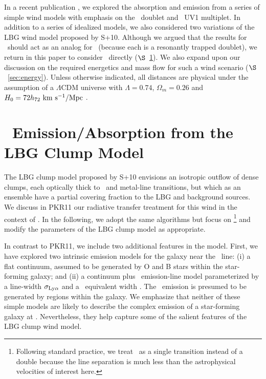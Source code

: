 \documentclass[12pt,preprint]{aastex}
\begin{document}
In a recent publication \citep[][hereafter PKR11]{pkr11}, 
we explored the absorption and emission from
a series of simple wind models with emphasis on the
\mgiid\ doublet and ~UV1 multiplet.  In addition to a
series of idealized models, we also considered two variations of the
LBG wind model proposed by S+10.  Although we argued that the results
for \mgii\ should act as an analog for \lya\ (because each is a
resonantly trapped doublet), we return in this paper to consider
\lya\ directly ($\S$~\ref{sec:lya}).  We also expand upon our discussion on the required
energetics and mass flow for such a wind scenario
($\S$~\ref{sec:energy}).  Unless otherwise indicated, all distances
are physical under the assumption of a $\Lambda$CDM universe with
$\Lambda = 0.74$, $\Omega_m = 0.26$ and 
$H_0 = 72 h_{72} \, \, {\rm km~s^{-1}}/{\rm Mpc}$ \citep{wmap05}.

\section{\lya\ Emission/Absorption from the LBG Clump Model}
\label{sec:lya}

The LBG clump model proposed by S+10 envisions an isotropic outflow of
dense clumps, each optically thick to \lya\ and metal-line
transitions, but which as an ensemble have a partial covering fraction to
the LBG and background sources.  We discuss in PKR11 our radiative
transfer treatment for this wind in the context of \mgiid.  In the
following, we adopt the same algorithms but focus on
\lya\footnote{Following standard practice, we treat \lya\ as a single
  transition instead of a double because the line separation is much less
  than the astrophysical velocities of interest here.}
and modify the parameters of the LBG clump model as appropriate.

In contrast to PKR11, we include two additional features in the
model.  First, we have explored two intrinsic emission models for the
galaxy near the \lya\ line: 
(i) a flat continuum, assumed to be generated by O and B stars within the
star-forming galaxy; and
(ii) a continuum plus \lya\ emission-line model parameterized by a
line-width $\sigma_{\rm Ly\alpha}$ and a \lya\ equivalent width \wlya.
The \lya\ emission is presumed to be generated by  regions within the
galaxy.  We emphasize that neither of these simple models are likely
to describe the complex emission of a star-forming galaxy at \lya.
Nevertheless, they help capture some of the salient features of the
LBG clump wind model.
\end{document}
